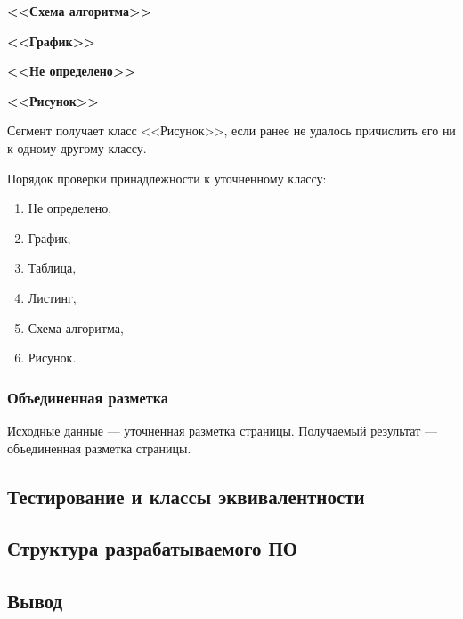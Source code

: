 \textbf{<<Схема алгоритма>>}

\textbf{<<График>>}

\textbf{<<Не определено>>}

\textbf{<<Рисунок>>}

Сегмент получает класс <<Рисунок>>, если ранее не удалось причислить его ни к одному другому классу.

Порядок проверки принадлежности к уточненному классу:
\begin{enumerate}
    \item Не определено,
    \item График,
    \item Таблица,
    \item Листинг,
    \item Схема алгоритма,
    \item Рисунок.
\end{enumerate}

\subsubsection{Объединенная разметка}

Исходные данные --- уточненная разметка страницы.
Получаемый результат --- объединенная разметка страницы.




\subsection{Тестирование и классы эквивалентности}

\subsection{Структура разрабатываемого ПО}

\subsection*{Вывод}
